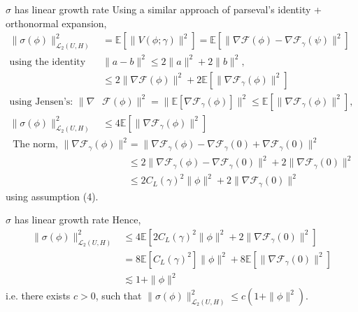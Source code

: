 \begin{frame}{$\sigma$ has linear growth rate}
    Using a similar approach of parseval's identity + orthonormal expansion,
    \begin{align*}
        \| \sigma(\phi) \|_{\mathcal{L}_2(U, H)}^2 &= \mathbb{E}[\|V(\phi;\gamma)\|^2] = \mathbb{E}[\| \nabla \mathcal{F}(\phi) - \nabla \mathcal{F}_{\gamma}(\psi) \|^2]\\
        \text{using the identity}& \|a - b\|^2 \leq 2 \|a\|^2 + 2\|b\|^2,\\
        &\leq 2 \|\nabla \mathcal{F}(\phi)\|^2 + 2 \mathbb{E}[\|\nabla \mathcal{F}_{\gamma}(\phi)\|^2]\\
        \text{using Jensen's: } \|\nabla &\mathcal{F}(\phi)\|^2 = \|\mathbb{E}[\nabla \mathcal{F}_{\gamma}(\phi)]\|^2 \leq \mathbb{E}[\|\nabla \mathcal{F}_{\gamma}(\phi)\|^2],\\
        \| \sigma(\phi) \|_{\mathcal{L}_2(U, H)}^2 &\leq 4\mathbb{E}[\|\nabla \mathcal{F}_{\gamma}(\phi)\|^2]
    \end{align*}
    \begin{align*}
        \text{ The norm, }\|\nabla \mathcal{F}_{\gamma}(\phi)\|^2 &= \|\nabla \mathcal{F}_{\gamma}(\phi) - \nabla \mathcal{F}_{\gamma}(0) + \nabla \mathcal{F}_{\gamma}(0)\|^2\\
        &\leq 2\|\nabla \mathcal{F}_{\gamma}(\phi) - \nabla \mathcal{F}_{\gamma}(0)\|^2 + 2\|\nabla \mathcal{F}_{\gamma}(0)\|^2\\
        &\leq 2 C_L(\gamma)^2 \|\phi\|^2 + 2\|\nabla \mathcal{F}_{\gamma}(0)\|^2
    \end{align*}
    using assumption (4).
\end{frame}
\begin{frame}{$\sigma$ has linear growth rate}
    Hence,
    \begin{align*}
        \| \sigma(\phi) \|_{\mathcal{L}_2(U, H)}^2 &\leq 4\mathbb{E}[2 C_L(\gamma)^2 \|\phi\|^2 + 2\|\nabla \mathcal{F}_{\gamma}(0)\|^2]\\
        &= 8\mathbb{E}[ C_L(\gamma)^2] \|\phi\|^2 + 8\mathbb{E}[\|\nabla \mathcal{F}_{\gamma}(0)\|^2]\\
        &\lesssim 1 + \|\phi\|^2
    \end{align*}
    i.e. there exists $c > 0$, such that $\| \sigma(\phi) \|_{\mathcal{L}_2(U, H)}^2 \leq c(1 + \|\phi\|^2)$.
\end{frame}
